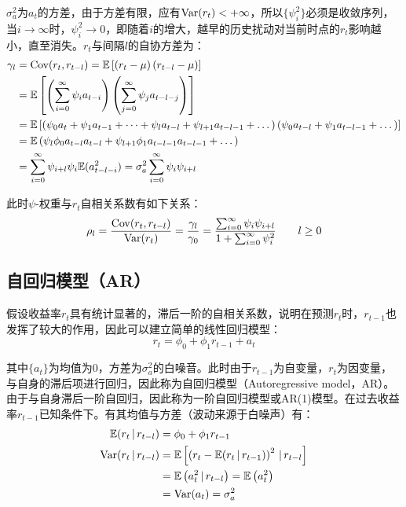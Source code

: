 \documentclass[11pt]{article}
\begin{document}
$\sigma_{a}^{2}$为$a_t$的方差，由于方差有限，应有$\operatorname{Var}(r_t)<+\infty$，所以$\{\psi_{i}^{2}\}$必须是收敛序列，当$i\rightarrow\infty$时，$\psi_{i}^{2}\rightarrow 0$，即随着$i$的增大，越早的历史扰动对当前时点的$r_t$影响越小，直至消失。$r_t$与间隔$l$的自协方差为：
\begin{align*}
    \gamma_l &= \operatorname{Cov}(r_t,r_{t-l})
    = \mathbb{E}\left[\left(r_t - \mu \right) \left(r_{t-l} - \mu \right) \right] \\
    &= \mathbb{E}\left[\left( \sum_{i=0}^{\infty} \psi_i a_{t-i} \right) \left( \sum_{j=0}^{\infty} \psi_j a_{t-l-j} \right) \right] \\
    &= \mathbb{E} \left[ \left( \psi_0 a_{t} + \psi_1 a_{t-1}  + \dots + \psi_l a_{t-l} + \psi_{l+1} a_{t-l-1}  + \dots \right) \left( \psi_0 a_{t-l} + \psi_1 a_{t-l-1} + \dots \right) \right] \\
    &= \mathbb{E} \left( \psi_l \phi_0 a_{t-l} a_{t-l} + \psi_{l+1} \phi_1 a_{t-l-1} a_{t-l-1}  + \dots \right)\\
    &= \sum_{i=0}^{\infty} \psi_{i+l} \psi_{i} \mathbb{E}(a_{t-l-i}^{2}) 
    = \sigma_{a}^{2} \sum_{i=0}^{\infty} \psi_i \psi_{i+l} 
\end{align*}

此时$\psi$-权重与$r_t$自相关系数有如下关系：
\begin{equation*}
    \rho_l = \frac{\operatorname{Cov}(r_t,r_{t-l})}{\operatorname{Var}(r_t)}
    = \frac{\gamma_l}{\gamma_0}
    = \frac{\sum_{i=0}^{\infty} \psi_i \psi_{i+l}}{1+ \sum_{i=0}^{\infty} \psi_i^2} \qquad l \geq 0
\end{equation*}

\subsection{自回归模型（AR）}

假设收益率$r_t$具有统计显著的，滞后一阶的自相关系数，说明在预测$r_t$时，$r_{t-1}$也发挥了较大的作用，因此可以建立简单的线性回归模型：
\begin{equation*}
    r_t = \phi_0 + \phi_1 r_{t-1} + a_t
\end{equation*}

其中$\{a_t\}$为均值为0，方差为$\sigma_{a}^2$的白噪音。此时由于$r_{t-1}$为自变量，$r_t$为因变量，与自身的滞后项进行回归，因此称为自回归模型（Autoregressive model，AR）。由于与自身滞后一阶自回归，因此称为一阶自回归模型或AR(1)模型。在过去收益率$r_{t-1}$已知条件下。有其均值与方差（波动来源于白噪声）有：
\begin{align*}
    \mathbb{E}(r_t \,\vert\, r_{t-l}) &= \phi_0 + \phi_1 r_{t-1} \\
    \operatorname{Var}(r_t \,\vert\, r_{t-l}) &= \mathbb{E}\left[\left(r_t - \mathbb{E}(r_t \,\vert\, r_{t-1}) \right)^2 \,\vert\, r_{t-l} \right] \\
    &= \mathbb{E} \left(a_t^2 \,\vert\, r_{t-l} \right) = \mathbb{E} \left(a_t^2\right) \\
    &= \operatorname{Var}(a_t) = \sigma_{a}^{2}
\end{align*}
\end{document}
